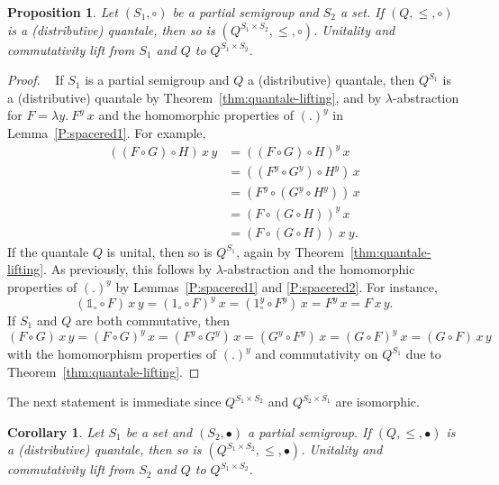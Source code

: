\documentclass[12pt]{article}
\newtheorem{proposition}{Proposition}
\newtheorem{corollary}{Corollary}
\theoremstyle{definition}
\newcommand{\refthm}[1]{Theorem~\ref{#1}}
\newcommand{\unit}{\mathbb{1}}
\begin{document}
\begin{proposition}\label{prop:seq-lifting}
  Let $(S_1,\circ)$ be a partial semigroup and $S_2$ a set.  If
  $(Q,\le,\circ)$ is a (distributive) quantale, then so is
  $(Q^{S_1\times S_2},\le,\circ)$. Unitality and commutativity lift
  from $S_1$ and $Q$ to $Q^{S_1\times S_2}$.
\end{proposition}
\begin{proof}~ If $S_1$ is a partial semigroup and $Q$ a
  (distributive) quantale, then $Q^{S_1}$ is a (distributive) quantale
  by \refthm{thm:quantale-lifting}, and by $\lambda$-abstraction for
  $F=\lambda y.\ F^y\ x$ and the homomorphic properties of $(.)^y$ in
  Lemma~\ref{P:spacered1}. For example,
  \begin{align*}
    ((F\circ G)\circ H)\, x\, y &= ((F\circ G)\circ H)^y\, x\\
& =
    ((F^y\circ G^y)\circ H^y)\, x\\
& = (F^y \circ (G^y\circ H^y))\, x\\
& = (F\circ (G\circ H))^y\, x\\
 &= (F\circ (G\circ H))\ x\ y.
   \end{align*}
  If the quantale $Q$ is unital, then so is $Q^{S_1}$, again by
  \refthm{thm:quantale-lifting}. As previously, this follows by
  $\lambda$-abstraction and the homomorphic properties of $(.)^y$ by
  Lemmas~\ref{P:spacered1} and \ref{P:spacered2}. For instance,
  \begin{equation*}
    (\unit_\circ\circ F)\, x\, y = (1_\circ\circ
    F)^y\ x = (1_\circ^y \circ F^y)\, x =  F^y\, x =F\, x\, y.
  \end{equation*}
  If $S_1$ and $Q$ are both commutative, then 
  \begin{equation*}
    (F\circ G)\, x\, y=(F\circ G)^y\, x= (F^y \circ G^y)\, x =
    (G^y\circ F^y)\, x= (G\circ F)^y\ x = (G\circ
    F)\, x\, y
  \end{equation*}
  with the homomorphism properties of $(.)^y$ and commutativity on
  $Q^{S_1}$ due to \refthm{thm:quantale-lifting}.
\end{proof}
The next statement is immediate since
$Q^{S_1\times S_2}$ and $Q^{S_2\times S_1}$ are isomorphic.
\begin{corollary}\label{cor:conc-lifting} 
  Let $S_1$ be a set and $(S_2,\bullet)$ a partial semigroup. If
  $(Q,\le,\bullet)$ is a (distributive) quantale, then so is
  $(Q^{S_1\times S_2},\le,\bullet)$. Unitality and commutativity lift
  from $S_2$  and $Q$ to $Q^{S_1\times S_2}$.
\end{corollary}
\end{document}

